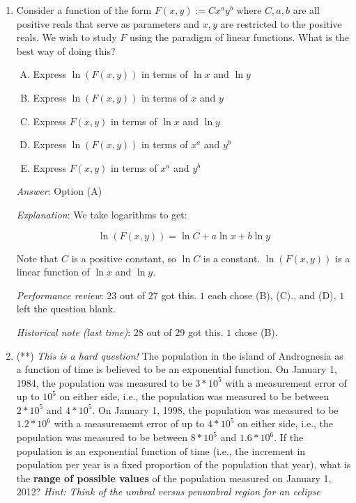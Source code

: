 \documentclass[10pt]{amsart}
\begin{document}
\begin{enumerate}
  {\em Explanation}: We take logarithms to get:

  $$\ln(F(x,y)) = \ln C + x \ln a + y \ln b$$

  Note that $a$, $b$, and $C$ are positive constants. Hence, $\ln C$,
  $\ln a$, and $\ln b$ are also constants. Thus, $\ln(F(x,y))$ is a
  linear function of $x$ and $y$.

  {\em Performance review}: $21$ out of $27$ got this. $4$ chose (A),
  $2$ chose (D).

  {\em Historical note (last time)}: $26$ out of $29$ got this. $3$ chose (A).

\item Consider a function of the form $F(x,y) := Cx^ay^b$ where
  $C,a,b$ are all positive reals that serve as parameters and $x,y$
  are restricted to the positive reals. We wish to study $F$ using the
  paradigm of linear functions. What is the best way of doing this?

  \begin{enumerate}[(A)]
  \item Express $\ln(F(x,y))$ in terms of $\ln x$ and $\ln y$
  \item Express $\ln(F(x,y))$ in terms of $x$ and $y$
  \item Express $F(x,y)$ in terms of $\ln x$ and $\ln y$
  \item Express $\ln(F(x,y))$ in terms of $x^a$ and $y^b$
  \item Express $F(x,y)$ in terms of $x^a$ and $y^b$
  \end{enumerate}

  {\em Answer}: Option (A)

  {\em Explanation}: We take logarithms to get:

  $$\ln(F(x,y)) = \ln C + a \ln x + b \ln y$$

  Note that $C$ is a positive constant, so $\ln C$ is a constant.
  $\ln(F(x,y))$ is a linear function of $\ln x$ and $\ln y$.

  {\em Performance review}: $23$ out of $27$ got this. $1$ each chose
  (B), (C)., and (D), $1$ left the question blank.

  {\em Historical note (last time)}: $28$ out of $29$ got this. $1$
  chose (B).

\item (**) {\em This is a hard question!} The population in the island
  of Andrognesia as a function of time is believed to be an
  exponential function. On January 1, 1984, the population was
  measured to be $3 * 10^5$ with a measurement error of up to $10^5$
  on either side, i.e., the population was measured to be between $2*
  10^5$ and $4 * 10^5$. On January 1, 1998, the population was
  measured to be $1.2 * 10^6$ with a measurememt error of up to $4 *
  10^5$ on either side, i.e., the population was measured to be
  between $8 * 10^5$ and $1.6 * 10^6$. If the population is an
  exponential function of time (i.e., the increment in population per
  year is a fixed proportion of the population that year), what is the
  {\bf range of possible values} of the population measured on January
  1, 2012? {\em Hint: Think of the umbral versus penumbral region for
    an eclipse}


\end{enumerate}
\end{document}
